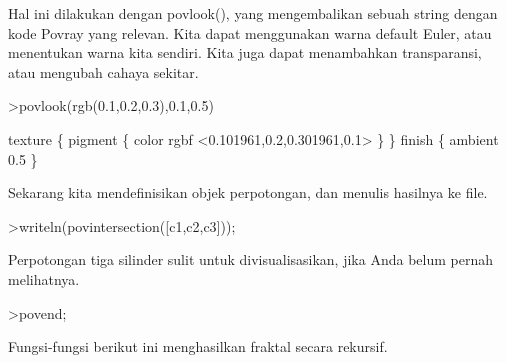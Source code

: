 \documentclass[a4paper,10pt]{article}
\begin{document}
\begin{eulernotebook}
\begin{eulercomment}
Hal ini dilakukan dengan povlook(), yang mengembalikan sebuah string
dengan kode Povray yang relevan. Kita dapat menggunakan warna default
Euler, atau menentukan warna kita sendiri. Kita juga dapat menambahkan
transparansi, atau mengubah cahaya sekitar.
\end{eulercomment}
\begin{eulerprompt}
>povlook(rgb(0.1,0.2,0.3),0.1,0.5)
\end{eulerprompt}
\begin{euleroutput}
   texture \{ pigment \{ color rgbf <0.101961,0.2,0.301961,0.1> \}  \} 
   finish \{ ambient 0.5 \} 
  
\end{euleroutput}
\begin{eulercomment}
Sekarang kita mendefinisikan objek perpotongan, dan menulis hasilnya
ke file.
\end{eulercomment}
\begin{eulerprompt}
>writeln(povintersection([c1,c2,c3]));
\end{eulerprompt}
\begin{eulercomment}
Perpotongan tiga silinder sulit untuk divisualisasikan, jika Anda
belum pernah melihatnya.
\end{eulercomment}
\begin{eulerprompt}
>povend;
\end{eulerprompt}
\begin{eulercomment}
Fungsi-fungsi berikut ini menghasilkan fraktal secara rekursif.


\end{eulercomment}
\end{eulernotebook}
\end{document}
